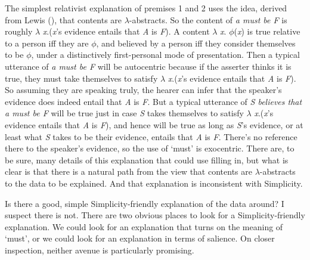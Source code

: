 \documentclass[
  11pt,
  letterpaper,
  DIV=11,
  numbers=noendperiod,
  twoside]{scrartcl}
\begin{document}
The simplest relativist explanation of premises 1 and 2 uses the idea,
derived from Lewis (), that contents are
\(\lambda\)-abstracts. So the content of \emph{a must be F} is roughly
\(\lambda\) \emph{x}.(\emph{x}'s evidence entails that \emph{A} is
\emph{F}). A content \(\lambda\) \emph{x}. \(\phi\)(\emph{x}) is true
relative to a person iff they are \(\phi\), and believed by a person iff
they consider themselves to be \(\phi\), under a distinctively
first-personal mode of presentation. Then a typical utterance of \emph{a
must be F} will be autocentric because if the asserter thinks it is
true, they must take themselves to satisfy \(\lambda\)
\emph{x}.(\emph{x}'s evidence entails that \emph{A} is \emph{F}). So
assuming they are speaking truly, the hearer can infer that the
speaker's evidence does indeed entail that \emph{A} is \emph{F}. But a
typical utterance of \emph{S believes that a must be F} will be true
just in case \emph{S} takes themselves to satisfy \(\lambda\)
\emph{x}.(\emph{x}'s evidence entails that \emph{A} is \emph{F}), and
hence will be true as long as \emph{S}'s evidence, or at least what
\emph{S} takes to be their evidence, entails that \emph{A} is \emph{F}.
There's no reference there to the speaker's evidence, so the use of
`must' is exocentric. There are, to be sure, many details of this
explanation that could use filling in, but what is clear is that there
is a natural path from the view that contents are \(\lambda\)-abstracts
to the data to be explained. And that explanation is inconsistent with
Simplicity.

Is there a good, simple Simplicity-friendly explanation of the data
around? I suspect there is not. There are two obvious places to look for
a Simplicity-friendly explanation. We could look for an explanation that
turns on the meaning of `must', or we could look for an explanation in
terms of salience. On closer inspection, neither avenue is particularly
promising.
\end{document}
